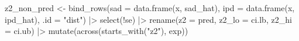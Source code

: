 \documentclass[
  letterpaper,
  DIV=11,
  numbers=noendperiod]{scrartcl}
\newenvironment{Shaded}{\begin{snugshade}}{\end{snugshade}}
\newcommand{\AttributeTok}[1]{\textcolor[rgb]{0.40,0.45,0.13}{#1}}
\newcommand{\FunctionTok}[1]{\textcolor[rgb]{0.28,0.35,0.67}{#1}}
\newcommand{\NormalTok}[1]{\textcolor[rgb]{0.00,0.23,0.31}{#1}}
\newcommand{\OtherTok}[1]{\textcolor[rgb]{0.00,0.23,0.31}{#1}}
\newcommand{\SpecialCharTok}[1]{\textcolor[rgb]{0.37,0.37,0.37}{#1}}
\newcommand{\StringTok}[1]{\textcolor[rgb]{0.13,0.47,0.30}{#1}}
\begin{document}
\begin{Shaded}
\begin{Highlighting}[]
\NormalTok{z2\_non\_pred }\OtherTok{\textless{}{-}} \FunctionTok{bind\_rows}\NormalTok{(}\AttributeTok{sad =} \FunctionTok{data.frame}\NormalTok{(x, sad\_hat), }
                         \AttributeTok{ipd =} \FunctionTok{data.frame}\NormalTok{(x, ipd\_hat), }
                         \AttributeTok{.id =} \StringTok{"dist"}\NormalTok{) }\SpecialCharTok{|\textgreater{}} 
    \FunctionTok{select}\NormalTok{(}\SpecialCharTok{!}\NormalTok{se) }\SpecialCharTok{|\textgreater{}} 
    \FunctionTok{rename}\NormalTok{(}\AttributeTok{z2 =}\NormalTok{ pred,}
           \AttributeTok{z2\_lo =}\NormalTok{ ci.lb, }
           \AttributeTok{z2\_hi =}\NormalTok{ ci.ub) }\SpecialCharTok{|\textgreater{}} 
    \FunctionTok{mutate}\NormalTok{(}\FunctionTok{across}\NormalTok{(}\FunctionTok{starts\_with}\NormalTok{(}\StringTok{"z2"}\NormalTok{), exp))}


\end{Highlighting}
\end{Shaded}
\end{document}
